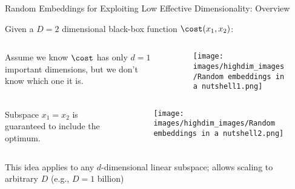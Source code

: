 \begin{frame}[c]{Random Embeddings for Exploiting Low Effective Dimensionality: Overview}

Given a $D=2$ dimensional black-box function $\cost(x_{1},x_{2})$:
\begin{itemize}
\begin{columns}[T]
\begin{column}{0.45\linewidth}


    \item Assume we know $\cost$ has only $d=1$ important dimensions, but we don't know which one it is.
    \end{column}
    \begin{column}{0.5\linewidth}
        \begin{figure}
    \texttt{[image: images/highdim\_images/Random embeddings in a nutshell1.png]}
    \end{figure}
    \end{column}
\end{columns}
    \pause
    \begin{columns}[T]
    \begin{column}{0.45\linewidth}
    \vspace{-1em}
    \item Subspace $x_1=x_2$ is guaranteed to include the optimum.
        \end{column}
        \begin{column}{0.5\linewidth}
    \begin{figure}
    \texttt{[image: images/highdim\_images/Random embeddings in a nutshell2.png]}
    \end{figure}
    \end{column}
\end{columns}
    \pause
\begin{columns}
\begin{column}{0.45\linewidth}
    \vspace{-8em}
    \item This idea applies to any $d$-dimensional linear subspace; allows scaling to arbitrary $D$ (e.g., $D=1$ billion)
\end{column}
\begin{column}{0.5\linewidth}

\end{column}
\end{columns}
\end{itemize}


\end{frame}

